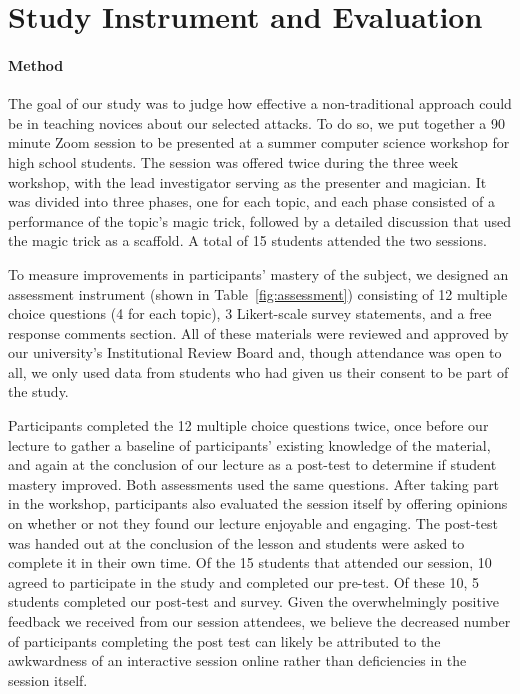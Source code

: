 \section{Study Instrument and Evaluation}
\label{SEC:evaluation}

\paragraph{Method}The goal of our study was to judge how effective a non-traditional approach
could be in teaching novices about our selected attacks.  To do so,
we put together a 90 minute Zoom session to be presented at a summer
computer science workshop for high school students.  The session was
offered twice during the three week workshop, with the lead investigator
serving as the presenter and magician.  It was divided into three phases,
one
for each topic,
and each phase consisted of a performance of the topic's magic
trick, followed by a detailed discussion that used the magic trick
as a scaffold.  A total of 15 students attended the two sessions.

To measure improvements in participants' mastery of the subject, we
designed an assessment instrument (shown in Table~\ref{fig:assessment})
consisting of
12 multiple choice questions (4 for each topic),
3 Likert-scale survey statements,
and a free response comments section.
All of these materials were reviewed and approved by our university's
Institutional Review Board and, though attendance was open to all, we only
used data from students who had given us their consent to be part of the
study.

Participants completed the 12 multiple choice questions twice,
once before our lecture to gather a baseline of
participants' existing knowledge of the material,
and again at the conclusion of our
lecture as a post-test to determine if student mastery improved.
Both assessments used the same questions.
After taking part in the workshop, participants also evaluated the session
itself by offering opinions on whether or not they found our lecture
enjoyable and engaging.
The post-test was handed out at the conclusion of the lesson
and students were asked
to complete it in their own time.
Of the 15 students that attended our session, 10 agreed to participate in
the study and completed our pre-test. Of these 10, 5
students completed our post-test and survey.  Given the overwhelmingly
positive feedback we received from our session attendees, we believe the
decreased number of participants completing the post test can likely
be attributed
to the awkwardness of an interactive session online
rather than deficiencies in
the session itself.


